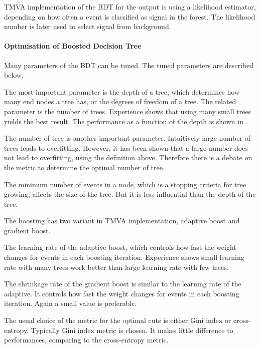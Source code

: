 
TMVA implementation of the BDT for the output is using a likelihood estimator, depending on how often a event is classified as signal in the forest. The likelihood number is later used to select signal from background.

\paragraph{Optimisation of Boosted Decision Tree}
\label{sec:pandoraMVAbdtVar}
Many parameters of the BDT can be tuned. The tuned parameters are described below.

The most important parameter is the depth of a tree, which determines how many end nodes a tree has, or the degrees of freedom of a tree. The related parameter is the number of trees. Experience shows that using many small trees yields the best result. The performance as a function of the depth is shown in .

The number of tree is another important parameter. Intuitively large number of trees leads to overfitting. However, it has been shown that a large number does not lead to overfitting, using the definition above. Therefore there is a debate on the metric to determine the optimal number of tree.

The minimum number of events in a node, which is a stopping criteria for tree growing, affects the size of the tree. But it is less influential than the depth of the tree.

The boosting has two variant in TMVA implementation, adaptive boost and gradient boost.

The learning rate of the adaptive boost, which controls how fast the weight changes for events in each boosting iteration. Experience shows small learning rate with many trees work better than large learning rate with few trees.

The shrinkage rate of the gradient boost is similar to the learning rate of the adaptive. It controls how fast the weight changes for events in each boosting iteration. Again a small value is preferable.

The usual choice of the metric for the optimal cuts is either Gini index or cross-entropy. Typically Gini index metric is chosen. It makes little difference to performances, comparing to the cross-entropy metric.

